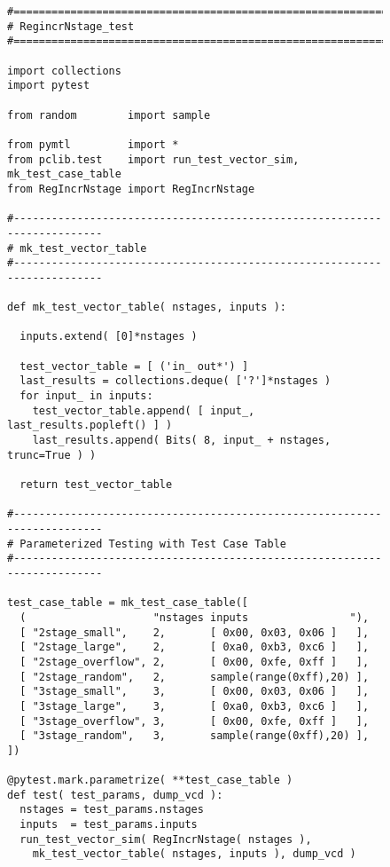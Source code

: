 
\begin{figure}

  \begin{lstlisting}[xleftmargin={0.9in}]
#=========================================================================
# RegincrNstage_test
#=========================================================================

import collections
import pytest

from random        import sample

from pymtl         import *
from pclib.test    import run_test_vector_sim, mk_test_case_table
from RegIncrNstage import RegIncrNstage

#-------------------------------------------------------------------------
# mk_test_vector_table
#-------------------------------------------------------------------------

def mk_test_vector_table( nstages, inputs ):

  inputs.extend( [0]*nstages )

  test_vector_table = [ ('in_ out*') ]
  last_results = collections.deque( ['?']*nstages )
  for input_ in inputs:
    test_vector_table.append( [ input_, last_results.popleft() ] )
    last_results.append( Bits( 8, input_ + nstages, trunc=True ) )

  return test_vector_table

#-------------------------------------------------------------------------
# Parameterized Testing with Test Case Table
#-------------------------------------------------------------------------

test_case_table = mk_test_case_table([
  (                    "nstages inputs                "),
  [ "2stage_small",    2,       [ 0x00, 0x03, 0x06 ]   ],
  [ "2stage_large",    2,       [ 0xa0, 0xb3, 0xc6 ]   ],
  [ "2stage_overflow", 2,       [ 0x00, 0xfe, 0xff ]   ],
  [ "2stage_random",   2,       sample(range(0xff),20) ],
  [ "3stage_small",    3,       [ 0x00, 0x03, 0x06 ]   ],
  [ "3stage_large",    3,       [ 0xa0, 0xb3, 0xc6 ]   ],
  [ "3stage_overflow", 3,       [ 0x00, 0xfe, 0xff ]   ],
  [ "3stage_random",   3,       sample(range(0xff),20) ],
])

@pytest.mark.parametrize( **test_case_table )
def test( test_params, dump_vcd ):
  nstages = test_params.nstages
  inputs  = test_params.inputs
  run_test_vector_sim( RegIncrNstage( nstages ),
    mk_test_vector_table( nstages, inputs ), dump_vcd )


\end{lstlisting}
\end{figure}

